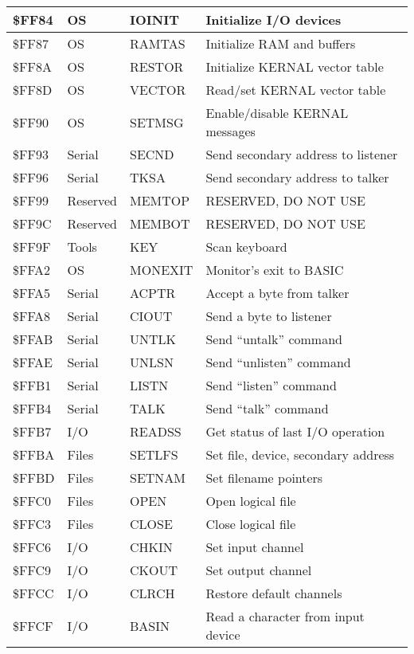 \begin{longtable}{|L{2cm}|p{2cm}|p{2cm}|L{6cm}|}
\$FF84 & OS & IOINIT & Initialize I/O devices \\
\hline
\$FF87 & OS & RAMTAS & Initialize RAM and buffers \\
\hline
\$FF8A & OS & RESTOR & Initialize KERNAL vector table \\
\hline
\$FF8D & OS & VECTOR & Read/set KERNAL vector table \\
\hline
\$FF90 & OS & SETMSG & Enable/disable KERNAL messages \\
\hline
\$FF93 & Serial & SECND & Send secondary address to listener \\
\hline
\$FF96 & Serial & TKSA & Send secondary address to talker \\
\hline
\$FF99 & Reserved & MEMTOP & RESERVED, DO NOT USE \\
\hline
\$FF9C & Reserved & MEMBOT & RESERVED, DO NOT USE \\
\hline
\$FF9F & Tools & KEY & Scan keyboard \\
\hline
\$FFA2 & OS & MONEXIT & Monitor's exit to BASIC \\
\hline
\$FFA5 & Serial & ACPTR & Accept a byte from talker \\
\hline
\$FFA8 & Serial & CIOUT & Send a byte to listener \\
\hline
\$FFAB & Serial & UNTLK & Send ``untalk'' command \\
\hline
\$FFAE & Serial & UNLSN & Send ``unlisten'' command \\
\hline
\$FFB1 & Serial & LISTN & Send ``listen'' command \\
\hline
\$FFB4 & Serial & TALK & Send ``talk'' command \\
\hline
\$FFB7 & I/O & READSS & Get status of last I/O operation \\
\hline
\$FFBA & Files & SETLFS & Set file, device, secondary address \\
\hline
\$FFBD & Files & SETNAM & Set filename pointers \\
\hline
\$FFC0 & Files & OPEN & Open logical file \\
\hline
\$FFC3 & Files & CLOSE & Close logical file \\
\hline
\$FFC6 & I/O & CHKIN & Set input channel \\
\hline
\$FFC9 & I/O & CKOUT & Set output channel \\
\hline
\$FFCC & I/O & CLRCH & Restore default channels \\
\hline
\$FFCF & I/O & BASIN & Read a character from input device \\
\hline

\end{longtable}
